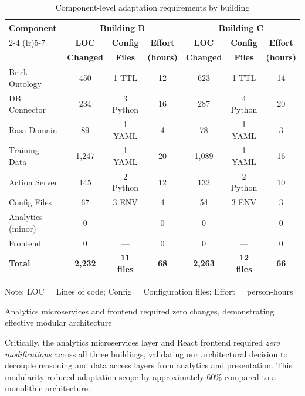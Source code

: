 \documentclass[acmlarge]{acmart}
\begin{document}
\begin{table}[h]
\centering
\begin{threeparttable}
\caption{Component-level adaptation requirements by building}
\label{tab:adaptation-components}
\scriptsize
\begin{tabular}{@{}lcccccc@{}}
\toprule
\multirow{2}{*}{\textbf{Component}} & \multicolumn{3}{c}{\textbf{Building B}} & \multicolumn{3}{c}{\textbf{Building C}} \\
\cmidrule(lr){2-4} \cmidrule(lr){5-7}
 & \textbf{LOC} & \textbf{Config} & \textbf{Effort} & \textbf{LOC} & \textbf{Config} & \textbf{Effort} \\
 & \textbf{Changed} & \textbf{Files} & \textbf{(hours)} & \textbf{Changed} & \textbf{Files} & \textbf{(hours)} \\
\midrule
Brick Ontology & 450 & 1 TTL & 12 & 623 & 1 TTL & 14 \\
DB Connector & 234 & 3 Python & 16 & 287 & 4 Python & 20 \\
Rasa Domain & 89 & 1 YAML & 4 & 78 & 1 YAML & 3 \\
Training Data & 1,247 & 1 YAML & 20 & 1,089 & 1 YAML & 16 \\
Action Server & 145 & 2 Python & 12 & 132 & 2 Python & 10 \\
Config Files & 67 & 3 ENV & 4 & 54 & 3 ENV & 3 \\
Analytics (minor) & 0 & — & 0 & 0 & — & 0 \\
Frontend & 0 & — & 0 & 0 & — & 0 \\
\midrule
\textbf{Total} & \textbf{2,232} & \textbf{11 files} & \textbf{68} & \textbf{2,263} & \textbf{12 files} & \textbf{66} \\
\bottomrule
\end{tabular}
\begin{tablenotes}
\small
\item Note: LOC = Lines of code; Config = Configuration files; Effort = person-hours
\item Analytics microservices and frontend required zero changes, demonstrating effective modular architecture
\end{tablenotes}
\end{threeparttable}
\end{table}

Critically, the analytics microservices layer and React frontend required \textit{zero modifications} across all three buildings, validating our architectural decision to decouple reasoning and data access layers from analytics and presentation. This modularity reduced adaptation scope by approximately 60\% compared to a monolithic architecture.
\end{document}
